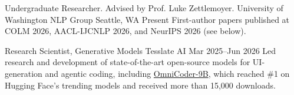 
\begin{cventries}
  \cventry
    {Undergraduate Researcher. {\selectfont Advised by Prof. Luke Zettlemoyer.}}
    {University of Washington NLP Group}
    {Seattle, WA}
    {Present}
    {{\upshape{}\selectfont First-author papers published at COLM 2026, AACL-IJCNLP 2026, and NeurIPS 2026 (see below).}}

  \cventry
    {Research Scientist, Generative Models}
    {Tesslate AI}
    {}
    {Mar 2025--Jun 2026}
    {{\upshape Led research and development of state-of-the-art open-source models for UI-generation and agentic coding, including \href{https://huggingface.co/Tesslate/OmniCoder-9B}{{\selectfont\color{awesome} OmniCoder-9B}}, which reached \#1 on Hugging Face's trending models and received more than 15{,}000 downloads.}}
\end{cventries}
